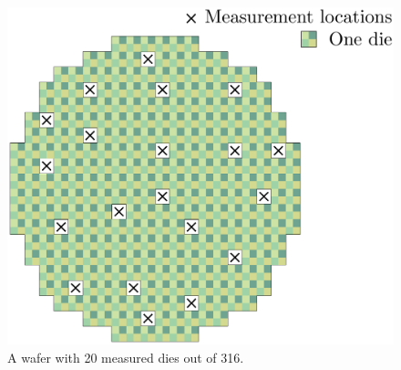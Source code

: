 \begin{figure}
  \centering
  \includegraphics[width=0.6\linewidth]{include/figures/wafer-measured.pdf}
  \caption{A wafer with 20 measured dies out of 316.}
\end{figure}
